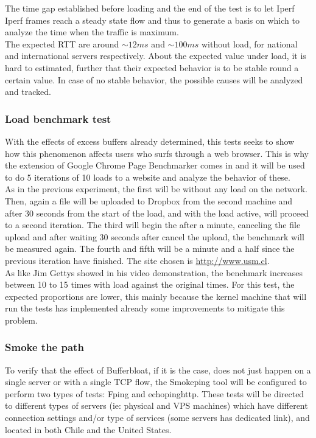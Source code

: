 The time gap established before loading and the end of the test is to let Iperf 
Iperf frames reach a steady state flow and thus to generate a basis on
which to analyze the time when the traffic is maximum.\\

The expected RTT are around $\sim12ms$ and $\sim100ms$ without load, for
national and international servers respectively. About the expected value under
load, it is hard to estimated, further that their expected behavior is 
to be stable round a certain value. In case of no stable behavior, the possible 
causes will be analyzed and tracked.\\

\subsubsection{Load benchmark test}
With the effects of excess buffers already determined, this tests seeks to show
how this phenomenon affects users who surfs through a web browser. This is why
the extension of Google Chrome Page Benchmarker comes in and it will be used to
do 5 iterations of 10 loads to a website and analyze the behavior of these. \\

As in the previous experiment, the first will be without any load on the
network. Then, again a file will be uploaded to Dropbox from the second machine
and after 30 seconds from the start of the load, and with the load active, will
proceed to a second iteration. The third will begin the after a minute,
canceling the file upload and after waiting 30 seconds after cancel the upload,
the benchmark will be measured again. The fourth and fifth will be a minute and
a half since the previous iteration have finished. The site chosen is
\url{http://www.usm.cl}.\\

As like Jim Gettys showed in his video demonstration\cite{gettysex}, the 
benchmark increases between 10 to 15 times with load against the original times. 
For this test, the expected proportions are lower, this mainly because the 
kernel machine that will run the tests has implemented already some improvements 
to mitigate this problem.\\

\subsubsection{Smoke the path}
To verify that the effect of Bufferbloat, if it is the case, does not just
happen on a single server or with a single TCP flow, the Smokeping tool will be
configured to perform two types of tests: Fping and echopinghttp. These tests
will be directed to different types of servers (ie: physical and VPS machines)
which have different connection settings and/or type of services (some servers
has dedicated link), and located in both Chile and the United States.

